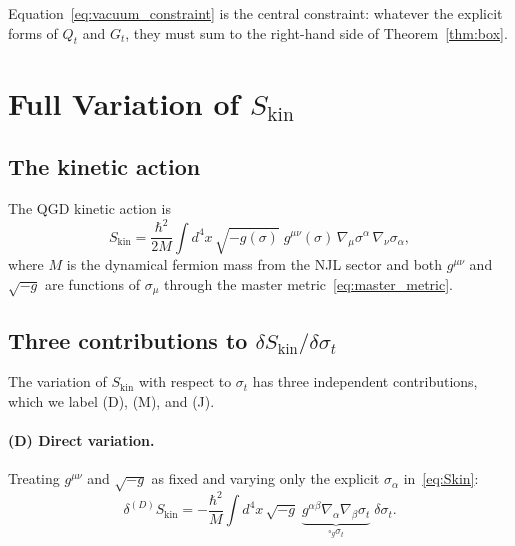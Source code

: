 \documentclass[11pt,a4paper]{article}
\theoremstyle{plain}
\theoremstyle{definition}
\newcommand{\sig}{\sigma}
\newcommand{\sigt}{\sigma_t}
\newcommand{\boxg}{\square_g}
\newcommand{\Skin}{S_{\mathrm{kin}}}
\begin{document}
Equation~\eqref{eq:vacuum_constraint} is the central constraint:
whatever the explicit forms of $Q_t$ and $G_t$, they must sum to
the right-hand side of Theorem~\ref{thm:box}.

\section{Full Variation of $\Skin$}

\subsection{The kinetic action}

The QGD kinetic action is
\begin{equation}\label{eq:Skin}
  \Skin = \frac{\hbar^2}{2M}\int d^4x\,
    \sqrt{-g(\sig)}\;g^{\mu\nu}(\sig)\,
    \nabla_\mu\sig^\alpha\,\nabla_\nu\sig_\alpha,
\end{equation}
where $M$ is the dynamical fermion mass from the NJL sector and both
$g^{\mu\nu}$ and $\sqrt{-g}$ are functions of $\sig_\mu$ through the
master metric~\eqref{eq:master_metric}.

\subsection{Three contributions to $\delta\Skin/\delta\sigt$}

The variation of $\Skin$ with respect to $\sigt$ has three independent
contributions, which we label (D), (M), and (J).

\paragraph{(D) Direct variation.}
Treating $g^{\mu\nu}$ and $\sqrt{-g}$ as fixed and varying only the
explicit $\sig_\alpha$ in~\eqref{eq:Skin}:
\begin{equation}\label{eq:direct}
  \delta^{(D)}\Skin
  = -\frac{\hbar^2}{M}\int d^4x\,\sqrt{-g}\;
    \underbrace{g^{\alpha\beta}\nabla_\alpha\nabla_\beta\sigt}_{\displaystyle\boxg\sigt}
  \;\delta\sigt.
\end{equation}
\end{document}
